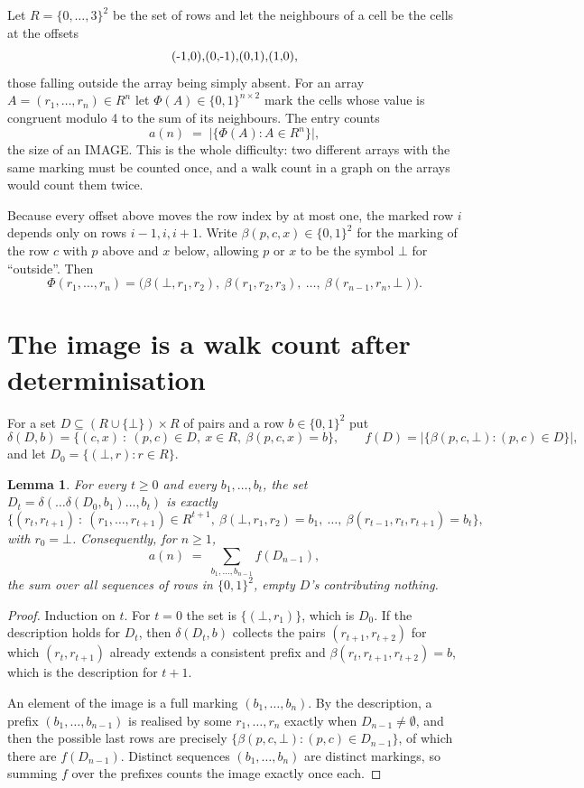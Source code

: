 \documentclass[11pt,a4paper]{article}
\theoremstyle{plain}
\newtheorem{lemma}[theorem]{Lemma}
\theoremstyle{definition}
\begin{document}
Let $R=\{0,\dots,3\}^{2}$ be the set of rows and let the neighbours of a cell be the
cells at the offsets
\[
$(-1,0)$, $(0,-1)$, $(0,1)$, $(1,0)$,
\]
those falling outside the array being simply absent. For an array
$A=(r_1,\dots,r_n)\in R^n$ let $\Phi(A)\in\{0,1\}^{n\times2}$ mark the cells whose value
is congruent modulo 4 to the sum of its neighbours. The entry counts
\[
a(n)\;=\;\bigl|\{\Phi(A):A\in R^n\}\bigr| ,
\]
the size of an IMAGE. This is the whole difficulty: two different arrays with the same marking
must be counted once, and a walk count in a graph on the arrays would count them twice.

Because every offset above moves the row index by at most one, the marked row $i$ depends only
on rows $i-1,i,i+1$. Write $\beta(p,c,x)\in\{0,1\}^{2}$ for the marking of the row $c$
with $p$ above and $x$ below, allowing $p$ or $x$ to be the symbol $\bot$ for ``outside''.
Then
\[
\Phi(r_1,\dots,r_n)=\bigl(\beta(\bot,r_1,r_2),\ \beta(r_1,r_2,r_3),\ \dots,\
\beta(r_{n-1},r_n,\bot)\bigr).
\]

\section{The image is a walk count after determinisation}

For a set $D\subseteq(R\cup\{\bot\})\times R$ of pairs and a row $b\in\{0,1\}^{2}$ put
\[
\delta(D,b)=\{(c,x)\ :\ (p,c)\in D,\ x\in R,\ \beta(p,c,x)=b\},\qquad
f(D)=\bigl|\{\beta(p,c,\bot):(p,c)\in D\}\bigr| ,
\]
and let $D_0=\{(\bot,r):r\in R\}$.

\begin{lemma}\label{lem:det}
For every $t\ge0$ and every $b_1,\dots,b_t$, the set
$D_t=\delta(\dots\delta(D_0,b_1)\dots,b_t)$ is exactly
\[
\{(r_t,r_{t+1})\ :\ (r_1,\dots,r_{t+1})\in R^{t+1},\ \beta(\bot,r_1,r_2)=b_1,\ \dots,\
\beta(r_{t-1},r_t,r_{t+1})=b_t\} ,
\]
with $r_0=\bot$. Consequently, for $n\ge1$,
\[
a(n)\;=\;\sum_{b_1,\dots,b_{n-1}}f(D_{n-1}),
\]
the sum over all sequences of rows in $\{0,1\}^{2}$, empty $D$'s contributing nothing.
\end{lemma}

\begin{proof}
Induction on $t$. For $t=0$ the set is $\{(\bot,r_1)\}$, which is $D_0$. If the description
holds for $D_t$, then $\delta(D_t,b)$ collects the pairs $(r_{t+1},r_{t+2})$ for which
$(r_t,r_{t+1})$ already extends a consistent prefix and
$\beta(r_t,r_{t+1},r_{t+2})=b$, which is the description for $t+1$.

An element of the image is a full marking $(b_1,\dots,b_n)$. By the description, a prefix
$(b_1,\dots,b_{n-1})$ is realised by some $r_1,\dots,r_n$ exactly when $D_{n-1}\neq
\emptyset$, and then the possible last rows are precisely
$\{\beta(p,c,\bot):(p,c)\in D_{n-1}\}$, of which there are $f(D_{n-1})$. Distinct
sequences $(b_1,\dots,b_n)$ are distinct markings, so summing $f$ over the prefixes counts the
image exactly once each.
\end{proof}
\end{document}
